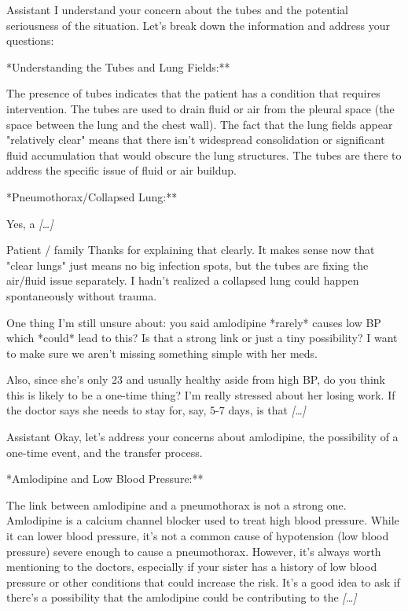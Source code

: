 \begin{assistantmsg}{Assistant}
I understand your concern about the tubes and the potential seriousness of the situation. Let's break down the information and address your questions:\par **Understanding the Tubes and Lung Fields:**\par The presence of tubes indicates that the patient has a condition that requires intervention. The tubes are used to drain fluid or air from the pleural space (the space between the lung and the chest wall). The fact that the lung fields appear "relatively clear" means that there isn't widespread consolidation or significant fluid accumulation that would obscure the lung structures. The tubes are there to address the specific issue of fluid or air buildup.\par **Pneumothorax/Collapsed Lung:**\par Yes, a  \textit{[\ldots]}
\end{assistantmsg}

\begin{patientmsg}{Patient / family}
Thanks for explaining that clearly. It makes sense now that "clear lungs" just means no big infection spots, but the tubes are fixing the air/fluid issue separately. I hadn't realized a collapsed lung could happen spontaneously without trauma. \par One thing I'm still unsure about: you said amlodipine *rarely* causes low BP which *could* lead to this? Is that a strong link or just a tiny possibility? I want to make sure we aren't missing something simple with her meds. \par Also, since she's only 23 and usually healthy aside from high BP, do you think this is likely to be a one-time thing? I'm really stressed about her losing work. If the doctor says she needs to stay for, say, 5-7 days, is that  \textit{[\ldots]}
\end{patientmsg}

\begin{assistantmsg}{Assistant}
Okay, let's address your concerns about amlodipine, the possibility of a one-time event, and the transfer process.\par **Amlodipine and Low Blood Pressure:**\par The link between amlodipine and a pneumothorax is not a strong one. Amlodipine is a calcium channel blocker used to treat high blood pressure. While it can lower blood pressure, it's not a common cause of hypotension (low blood pressure) severe enough to cause a pneumothorax. However, it's always worth mentioning to the doctors, especially if your sister has a history of low blood pressure or other conditions that could increase the risk. It's a good idea to ask if there's a possibility that the amlodipine could be contributing to the  \textit{[\ldots]}
\end{assistantmsg}

